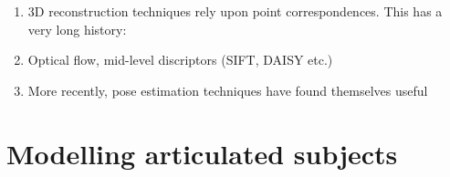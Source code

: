 






\begin{enumerate}
    \item 3D reconstruction techniques rely upon point correspondences. This has a very long history:
    \item Optical flow, mid-level discriptors (SIFT, DAISY etc.)
    \item More recently, pose estimation techniques have found themselves useful 
\end{enumerate}




\section{Modelling articulated subjects}

